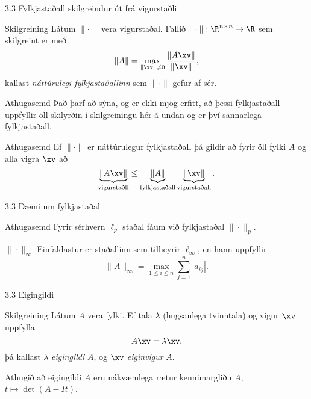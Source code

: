 \begin{frame}{3.3 Fylkjastaðall skilgreindur út frá vigurstaðli}
 \begin{block}{Skilgreining}
  Látum $\|\cdot\|$ vera vigurstaðal. Fallið $\|\cdot\|:\R^{n\times n} \to \R$
sem skilgreint er með 
$$
\|A\| = \max_{\|\xv\| \neq 0} \frac{\|A\xv\|}{\|\xv\|},
$$
kallast \emph{náttúrulegi fylkjastaðallinn} sem $\|\cdot\|$ gefur af sér.
 \end{block}

\pause

\begin{block}{Athugasemd}
 Það þarf að sýna, og er ekki mjög erfitt, að þessi fylkjastaðall uppfyllir
öll skilyrðin í skilgreiningu hér á undan og er því sannarlega fylkjastaðall.
\end{block}

\pause

\begin{block}{Athugasemd}
 Ef $\|\cdot\|$ er náttúrulegur fylkjastaðall þá gildir að fyrir öll fylki $A$ og alla vigra $\xv$ að
$$
\underbrace{\|A\xv\|}_{\text{vigurstaðll}} \leq \underbrace{\|A\|}_{\text{fylkjastaðall}}
\underbrace{\|\xv\|}_{\text{vigurstaðall}}.
$$
\end{block}


\end{frame}

\begin{frame}{3.3 Dæmi um fylkjastaðal}
\begin{block}{Athugasemd}
Fyrir sérhvern $\ell_p$ staðal fáum við fylkjastaðal $\|\cdot\|_p$. 
\end{block}

\begin{block}{$\|\cdot\|_\infty$}
Einfaldastur er staðallinn sem tilheyrir $\ell_\infty$, en hann uppfyllir
$$
\|A\|_\infty = \max_{1\leq i \leq n} \sum_{j=1}^n |a_{ij}|.
$$
\end{block}
\end{frame}

\begin{frame}{3.3 Eigingildi}
\begin{block}{Skilgreining}
 Látum $A$ vera fylki. Ef tala $\lambda$ (hugsanlega tvinntala) og vigur $\xv$ uppfylla 
$$
A\xv = \lambda \xv,
$$
þá kallast $\lambda$ \emph{eigingildi} $A$, og $\xv$ \emph{eiginvigur} $A$.\pause

\medskip

Athugið að eigingildi $A$ eru nákvæmlega rætur kennimargliðu $A$, $t \mapsto \det(A-It)$. 
\end{block}
\end{frame}

